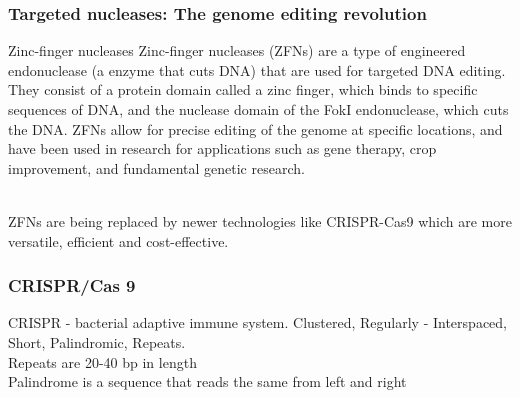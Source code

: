\begin{itemize}
\begin{itemize}
\subsubsection{Targeted nucleases: The genome editing revolution}
Zinc-finger nucleases
Zinc-finger nucleases (ZFNs) are a type of engineered endonuclease (a enzyme that cuts DNA) that are used for targeted DNA editing. They consist of a protein domain called a zinc finger, which binds to specific sequences of DNA, and the nuclease domain of the FokI endonuclease, which cuts the DNA. ZFNs allow for precise editing of the genome at specific locations, and have been used in research for applications such as gene therapy, crop improvement, and fundamental genetic research.

\\ZFNs are being replaced by newer technologies like CRISPR-Cas9 which are more versatile, efficient and cost-effective.

\subsubsection{CRISPR/Cas 9}
CRISPR - bacterial adaptive immune system.
Clustered, Regularly - Interspaced, Short, Palindromic, Repeats.
\\Repeats are 20-40 bp in length
\\Palindrome is a sequence that reads the same from left and right


\end{itemize}
\end{itemize}
